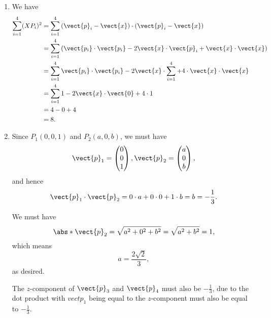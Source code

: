 \begin{enumerate}
    \item We have
          \begin{align*}
              \sum_{i = 1}^{4} (X P_i)^2 & = \sum_{i = 1}^{4} \left(\vect{p}_i - \vect{x}\right) \cdot \left(\vect{p}_i - \vect{x}\right)                       \\
                                         & = \sum_{i = 1}^{4} \left(\vect{p_i} \cdot \vect{p_i} - 2 \vect{x} \cdot \vect{p}_i + \vect{x} \cdot \vect{x}\right)  \\
                                         & = \sum_{i = 1}^{4} \vect{p_i} \cdot \vect{p_i} - 2 \vect{x} \cdot \sum_{i = 1}^{4} + 4 \cdot \vect{x} \cdot \vect{x} \\
                                         & = \sum_{i = 1}^{4} 1 - 2 \vect{x} \cdot \vect{0} + 4 \cdot 1                                                         \\
                                         & = 4 - 0 + 4                                                                                                          \\
                                         & = 8.
          \end{align*}

    \item Since \(P_1 (0, 0, 1)\) and \(P_2 (a, 0, b)\), we must have
          \[
              \vect{p}_1 = \begin{pmatrix}
                  0 \\ 0 \\ 1
              \end{pmatrix},
              \vect{p}_2 = \begin{pmatrix}
                  a \\ 0 \\ b
              \end{pmatrix},
          \]
          and hence
          \[
              \vect{p}_1 \cdot \vect{p}_2 = 0 \cdot a + 0 \cdot 0 + 1 \cdot b = b = - \frac{1}{3}.
          \]

          We must have
          \[
              \abs*{\vect{p}_2} = \sqrt{a^2 + 0^2 + b^2} = \sqrt{a^2 + b^2} = 1,
          \]
          which means
          \[
              a = \frac{2\sqrt{2}}{3},
          \]
          as desired.

          The \(z\)-component of \(\vect{p}_3\) and \(\vect{p}_4\) must also be \(-\frac{1}{3}\), due to the dot product with \(vect{p}_1\) being equal to the \(z\)-component must also be equal to \(-\frac{1}{3}\).


\end{enumerate}
